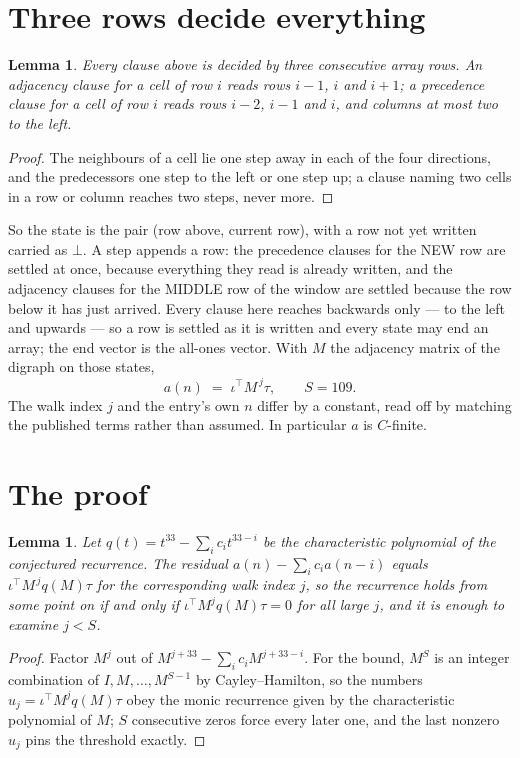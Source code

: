\documentclass[11pt,a4paper]{article}
\theoremstyle{plain}
\newtheorem{lemma}[theorem]{Lemma}
\theoremstyle{definition}
\begin{document}
\section{Three rows decide everything}

\begin{lemma}\label{lem:win}
Every clause above is decided by three consecutive array rows. An adjacency clause for a cell
of row $i$ reads rows $i-1$, $i$ and $i+1$; a precedence clause for a cell of row $i$ reads
rows $i-2$, $i-1$ and $i$, and columns at most two to the left.
\end{lemma}

\begin{proof}
The neighbours of a cell lie one step away in each of the four directions, and the predecessors
one step to the left or one step up; a clause naming two cells in a row or column reaches two
steps, never more.
\end{proof}

So the state is the pair (row above, current row), with a row not yet written carried as
$\bot$. A step appends a row: the precedence clauses for the NEW row are settled at once,
because everything they read is already written, and the adjacency clauses for the MIDDLE row
of the window are settled because the row below it has just arrived. Every clause here reaches backwards only --- to the left and upwards --- so a
row is settled as it is written and every state may end an array; the end vector is the
all-ones vector. With $M$ the
adjacency matrix of the digraph on those states,
\[
a(n)\;=\;\iota^{\!\top}M^{\,j}\tau ,\qquad S=109.
\]
The walk index $j$ and the entry's own $n$ differ by a constant, read off by matching the
published terms rather than assumed. In particular $a$ is $C$-finite.

\section{The proof}

\begin{lemma}\label{lem:crit}
Let $q(t)=t^{33}-\sum_i c_it^{33-i}$ be the characteristic polynomial of the
conjectured recurrence. The residual $a(n)-\sum_ic_ia(n-i)$ equals
$\iota^{\!\top}M^{\,j}q(M)\tau$ for the corresponding walk index $j$, so the recurrence
holds from some point on if and only if $\iota^{\!\top}M^{j}q(M)\tau=0$ for all large $j$,
and it is enough to examine $j<S$.
\end{lemma}

\begin{proof}
Factor $M^{j}$ out of $M^{j+33}-\sum_ic_iM^{j+33-i}$. For the bound, $M^{S}$
is an integer combination of $I,M,\dots,M^{S-1}$ by Cayley--Hamilton, so the numbers
$u_j=\iota^{\!\top}M^{j}q(M)\tau$ obey the monic recurrence given by the characteristic
polynomial of $M$; $S$ consecutive zeros force every later one, and the last nonzero $u_j$
pins the threshold exactly.
\end{proof}
\end{document}
